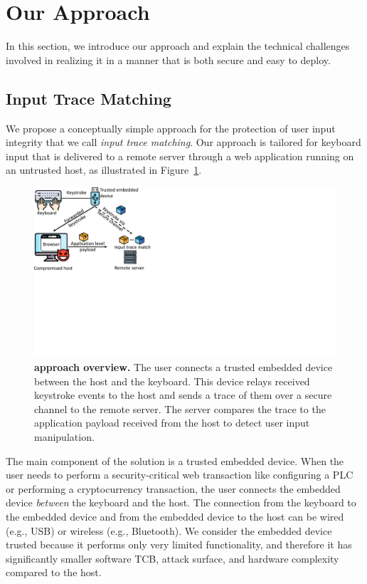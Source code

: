 \section{Our Approach}
\label{sec:ourApproach}

In this section, we introduce our approach and explain the technical challenges involved in realizing it in a manner that is both secure and easy to deploy. 

\subsection{Input Trace Matching}

We propose a conceptually simple approach for the protection of user input integrity that we call \emph{input trace matching}. Our approach is tailored for keyboard input that is delivered to a remote server through a web application running on an untrusted host, as illustrated in Figure~\ref{fig:abstractModel}. 

\begin{figure}[t]
 \centering
  \includegraphics[trim={0 9cm 19.5cm 0},clip,width=0.7\linewidth]{chapters/IntegriKey/images/AbstractModel.pdf}
 \caption[Approach overview]{\textbf{\integrikey approach overview.} The user connects a trusted embedded device between the host and the keyboard. This device relays received keystroke events to the host and sends a trace of them over a secure channel to the remote server. The server compares the trace to the application payload received from the host to detect user input manipulation.}
 
 \label{fig:abstractModel}
\end{figure}

The main component of the solution is a trusted embedded device. When the user needs to perform a security-critical web transaction like configuring a PLC or performing a cryptocurrency transaction, the user connects the embedded device \emph{between} the keyboard and the host. The connection from the keyboard to the embedded device and from the embedded device to the host can be wired (e.g., USB) or wireless (e.g., Bluetooth). We consider the embedded device trusted because it performs only very limited functionality, and therefore it has significantly smaller software TCB, attack surface, and hardware complexity compared to the host. 

